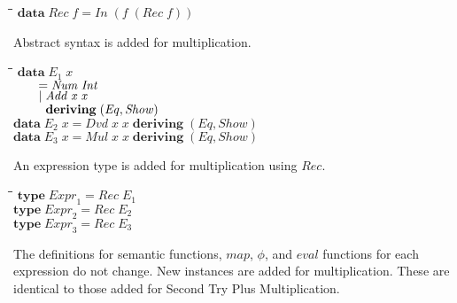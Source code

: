 \documentclass[10pt]{article}
\newlength{\lwidth}\setlength{\lwidth}{4.5cm}
\newlength{\cwidth}\setlength{\cwidth}{8mm} %
\newcommand{\Conid}[1]{\mathit{#1}}
\newcommand{\Varid}[1]{\mathit{#1}}
\begin{document}
\begin{tabbing}
\qquad\=\hspace{\lwidth}\=\hspace{\cwidth}\=\+\kill
${\mathbf{data}\;\Conid{Rec}\;\Varid{f}\mathrel{=}\Conid{In}\;(\Varid{f}\;(\Conid{Rec}\;\Varid{f}))}$
\end{tabbing}
Abstract syntax is added for multiplication.

\begin{tabbing}
\qquad\=\hspace{\lwidth}\=\hspace{\cwidth}\=\+\kill
${\mathbf{data}\;\Varid{E}_1\;\Varid{x}}$\\
${\hskip2.00em\relax\mathrel{=}\Conid{Num}\;\Conid{Int}}$\\
${\hskip2.00em\relax\mid \Conid{Add}\;\Varid{x}\;\Varid{x}}$\\
${\hskip2.00em\relax\phantom{\mid \mbox{}}\mathbf{deriving}\;(\Conid{Eq},\Conid{Show})}$\\
${}$\\
${\mathbf{data}\;\Varid{E}_2\;\Varid{x}\mathrel{=}\Conid{Dvd}\;\Varid{x}\;\Varid{x}\;\mathbf{deriving}\;(\Conid{Eq},\Conid{Show})}$\\
${}$\\
${\mathbf{data}\;\Varid{E}_3\;\Varid{x}\mathrel{=}\Conid{Mul}\;\Varid{x}\;\Varid{x}\;\mathbf{deriving}\;(\Conid{Eq},\Conid{Show})}$
\end{tabbing}
An expression type is added for multiplication using \ensuremath{\Conid{Rec}}.

\begin{tabbing}
\qquad\=\hspace{\lwidth}\=\hspace{\cwidth}\=\+\kill
${\mathbf{type}\;\Varid{Expr}_1\mathrel{=}\Conid{Rec}\;\Varid{E}_1}$\\
${\mathbf{type}\;\Varid{Expr}_2\mathrel{=}\Conid{Rec}\;\Varid{E}_2}$\\
${\mathbf{type}\;\Varid{Expr}_3\mathrel{=}\Conid{Rec}\;\Varid{E}_3}$
\end{tabbing}
The definitions for semantic functions, \ensuremath{\Varid{map}}, \ensuremath{\Varid{\phi}}, and \ensuremath{\Varid{eval}}
functions for each expression do not change.  New instances are added
for multiplication.  These are identical to those added for Second Try
Plus Multiplication.
\end{document}
